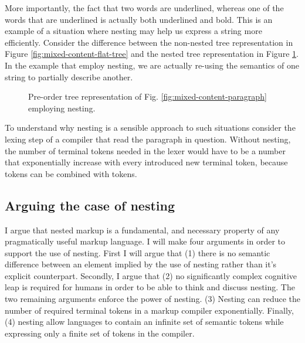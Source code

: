 \documentclass{scrreprt}
\begin{document}
More importantly, the fact that two words are underlined, whereas one of the words that are underlined is actually both underlined and bold. This is an example of a situation where nesting may help us express a string more efficiently. Consider the difference between the non-nested tree representation in Figure \ref{fig:mixed-content-flat-tree} and the nested tree representation in Figure \ref{fig:mixed-content-tree}. In the example that employ nesting, we are actually re-using the semantics of one string to partially describe another.


\begin{figure}[h]
  \centering

  \caption{Pre-order tree representation of Fig. \ref{fig:mixed-content-paragraph} employing nesting.}
  \label{fig:mixed-content-tree}
\end{figure}



To understand why nesting is a sensible approach to such situations consider the lexing step of a compiler that read the paragraph in question. Without nesting, the number of terminal tokens needed in the lexer would have to be a number that exponentially increase with every introduced new terminal token, because tokens can be combined with tokens.






\subsection{Arguing the case of nesting}
I argue that nested markup is a fundamental, and necessary property of any pragmatically useful markup language. I will make four arguments in order to support the use of nesting. First I will argue that (1) there is no semantic difference between an element implied by the use of nesting rather than it's explicit counterpart. Secondly, I argue that (2) no significantly complex cognitive leap is required for humans in order to be able to think and discuss nesting. The two remaining arguments enforce the power of nesting. (3) Nesting can reduce the number of required terminal tokens in a markup compiler exponentially. Finally, (4) nesting allow languages to contain an infinite set of semantic tokens while expressing only a finite set of tokens in the compiler.
\end{document}
